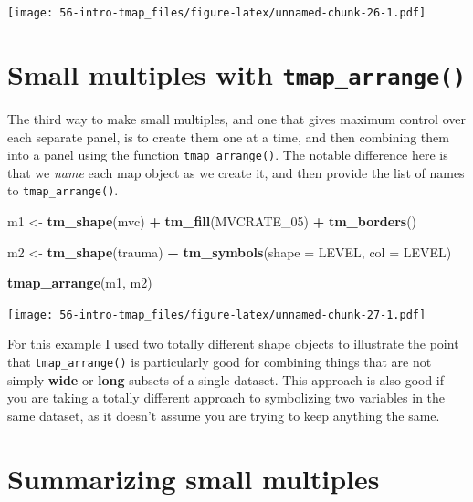 \documentclass[
]{book}
\newenvironment{Shaded}{\begin{snugshade}}{\end{snugshade}}
\newcommand{\AttributeTok}[1]{\textcolor[rgb]{0.13,0.29,0.53}{#1}}
\newcommand{\FunctionTok}[1]{\textcolor[rgb]{0.13,0.29,0.53}{\textbf{#1}}}
\newcommand{\NormalTok}[1]{#1}
\newcommand{\OtherTok}[1]{\textcolor[rgb]{0.56,0.35,0.01}{#1}}
\newcommand{\SpecialCharTok}[1]{\textcolor[rgb]{0.81,0.36,0.00}{\textbf{#1}}}
\newcommand{\StringTok}[1]{\textcolor[rgb]{0.31,0.60,0.02}{#1}}
\begin{document}
\texttt{[image: 56-intro-tmap\_files/figure-latex/unnamed-chunk-26-1.pdf]}

\hypertarget{small-multiples-with-tmap_arrange}{%
\section{\texorpdfstring{Small multiples with \texttt{tmap\_arrange()}}{Small multiples with tmap\_arrange()}}\label{small-multiples-with-tmap_arrange}}

The third way to make small multiples, and one that gives maximum control over each separate panel, is to create them one at a time, and then combining them into a panel using the function \texttt{tmap\_arrange()}. The notable difference here is that we \emph{name} each map object as we create it, and then provide the list of names to \texttt{tmap\_arrange()}.

\begin{Shaded}
\begin{Highlighting}[]
\NormalTok{m1 }\OtherTok{\textless{}{-}} \FunctionTok{tm\_shape}\NormalTok{(mvc) }\SpecialCharTok{+}
  \FunctionTok{tm\_fill}\NormalTok{(}\StringTok{\textquotesingle{}MVCRATE\_05\textquotesingle{}}\NormalTok{) }\SpecialCharTok{+}
  \FunctionTok{tm\_borders}\NormalTok{()}

\NormalTok{m2 }\OtherTok{\textless{}{-}} \FunctionTok{tm\_shape}\NormalTok{(trauma) }\SpecialCharTok{+}
  \FunctionTok{tm\_symbols}\NormalTok{(}\AttributeTok{shape =} \StringTok{\textquotesingle{}LEVEL\textquotesingle{}}\NormalTok{,}
             \AttributeTok{col =} \StringTok{\textquotesingle{}LEVEL\textquotesingle{}}\NormalTok{)}

\FunctionTok{tmap\_arrange}\NormalTok{(m1, m2)}
\end{Highlighting}
\end{Shaded}

\texttt{[image: 56-intro-tmap\_files/figure-latex/unnamed-chunk-27-1.pdf]}

For this example I used two totally different shape objects to illustrate the point that \texttt{tmap\_arrange()} is particularly good for combining things that are not simply \textbf{wide} or \textbf{long} subsets of a single dataset. This approach is also good if you are taking a totally different approach to symbolizing two variables in the same dataset, as it doesn't assume you are trying to keep anything the same.

\hypertarget{summarizing-small-multiples}{%
\section{Summarizing small multiples}\label{summarizing-small-multiples}}
\end{document}

